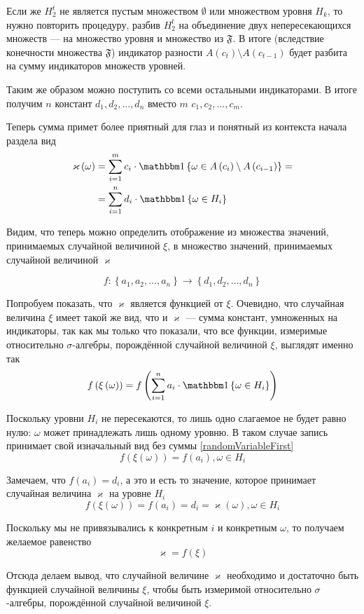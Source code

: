 Если же $H_2^t$ не является пустым множеством $\emptyset$
или множеством уровня $H_k$, то нужно повторить процедуру,
разбив $H_2^t$ на объединение двух непересекающихся множеств --- на множество
уровня и множество из $\mathfrak{F}$.
В итоге (вследствие конечности множества $\mathfrak{F}$)
индикатор разности $A\left( c_{t} \right) \setminus A\left( c_{t-1} \right)$
будет разбита на сумму индикаторов множеств уровней.

Таким же образом можно поступить со всеми остальными индикаторами.
В итоге получим $n$ констант $d_1, d_2, \dots, d_n$
вместо $m$ $c_1, c_2, \dots, c_m$.

Теперь сумма примет более приятный для глаз
и понятный из контекста начала раздела вид
\begin{align*}
    \varkappa\left( \omega \right)
        &= \sum_{i=1}^m c_i \cdot \Indicator{\omega
            \in A\left( c_{i} \right) \setminus A\left( c_{i-1} \right)} = \\
        &= \sum_{i=1}^n d_i \cdot \Indicator{\omega \in H_i}
\end{align*}

Видим, что теперь можно определить отображение из множества значений,
принимаемых случайной величиной $\xi$, в множество значений,
принимаемых случайной величиной $\varkappa$

$$f: \left\{ a_1, a_2, \dots, a_n \right\}
    \rightarrow \left\{ d_1, d_2, \dots, d_n \right\}$$

Попробуем показать, что $\varkappa$ является функцией от $\xi$.
Очевидно, что случайная величина $\xi$ имеет такой же вид,
что и $\varkappa$ --- сумма констант, умноженных на индикаторы,
так как мы только что показали, что все функции,
измеримые относительно $\sigma$-алгебры, порождённой случайной величиной $\xi$,
выглядят именно так
$$f\left( \xi\left( \omega \right) \right)
    = f\left( \sum_{i=1}^n a_i \cdot \Indicator{\omega \in H_i} \right)$$

Поскольку уровни $H_i$ не пересекаются,
то лишь одно слагаемое не будет равно нулю:
$\omega$ может принадлежать лишь одному уровню.
В таком случае запись принимает свой изначальный вид без суммы
\eqref{randomVariableFirst}
$$f\left( \xi\left( \omega \right) \right)
    = f\left( a_i \right), \omega \in H_i$$

Замечаем, что $f\left( a_i \right) = d_i$, а это и есть то значение,
которое принимает случайная величина $\varkappa$ на уровне $H_i$
$$f\left( \xi\left( \omega \right) \right)
    = f\left( a_i \right) = d_i
    = \varkappa\left( \omega \right), \omega \in H_i$$

Поскольку мы не привязывались к конкретным $i$ и конкретным $\omega$,
то получаем желаемое равенство
$$\varkappa = f\left( \xi \right)$$

Отсюда делаем вывод, что случайной величине $\varkappa$
необходимо и достаточно быть функцией случайной величины $\xi$,
чтобы быть измеримой относительно $\sigma$-алгебры,
порождённой случайной величиной $\xi$.
